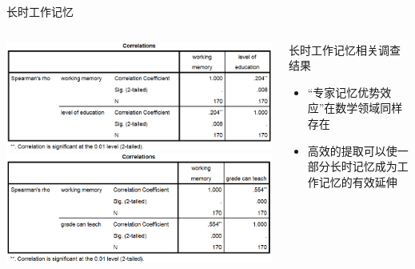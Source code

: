 \documentclass[serif]{beamer}
\begin{document}
    \begin{frame}{长时工作记忆}
        \begin{columns}
        	\includegraphics[scale=0.35]{levelofeducation.png} \\
        	\includegraphics[scale=0.35]{gradecanteach.png}
        	\begin{block}{\small{长时工作记忆相关调查结果}}
        		\begin{itemize}
        			\item  \footnotesize {“专家记忆优势效应”在数学领域同样存在}
        			\item  \footnotesize {高效的提取可以使一部分长时记忆成为工作记忆的有效延伸}
        		\end{itemize}
        	\end{block} 
        \end{columns}
    \end{frame}
    
\end{document}
